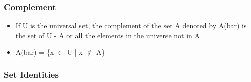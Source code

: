\documentclass[11pt]{article}
\begin{document}
\subsubsection{Complement}
\label{sec-2-2-5}
\begin{itemize}

\item If U is the universal set, the complement of the set A denoted by A(bar) is the set of U - A or all the elements in the universe not in A
\label{sec-2-2-5-1}%

\item A(bar) = \{x $\in$ U | x $\notin$ A\}
\label{sec-2-2-5-2}%
\end{itemize} %
\subsubsection{Set Identities}
\label{sec-2-2-6}
\end{document}
